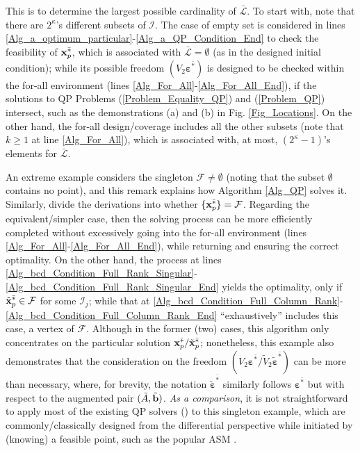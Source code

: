 \documentclass{imaman}
\newcommand{\bfb}{{\bf b}}
\newcommand{\bfx}{{\bf x}}
\newcommand{\bfvarepsilon}{{\boldsymbol \varepsilon}}
\newcommand{\calF}{{\mathcal F}}
\newcommand{\calI}{{\mathcal I}}
\newcommand{\calL}{{\mathcal L}}
\numberwithin{equation}{section}
\begin{document}
\begin{remark}
This is to determine the largest possible cardinality of $\bar\calL$. To start with, note that there are $2^\kappa$'s different subsets of $\calI$. The case of empty set is considered in lines \ref{Alg_a_optimum_particular}-\ref{Alg_a_QP_Condition_End} to check the feasibility of $\bfx_p^{\bar *}$, which is associated with $\bar\calL=\emptyset$ (as in the designed initial condition); while its possible freedom $(V_2\bfvarepsilon^{\bar *})$ is designed to be checked within the for-all environment (lines \ref{Alg_For_All}-\ref{Alg_For_All_End}), if the solutions to QP Problems (\ref{Problem_Equality_QP}) and (\ref{Problem_QP}) intersect, such as the demonstrations (a) and (b) in Fig. \ref{Fig_Locations}. On the other hand, the for-all design/coverage includes all the other subsets (note that $k\ge 1$ at line \ref{Alg_For_All}), which is associated with, at most, $(2^\kappa-1)$'s elements for $\bar\calL$.
\label{Rem_Candidates_Cardinality}
\end{remark}

\begin{remark}
An extreme example considers the singleton $\calF\ne\emptyset$ (noting that the subset $\emptyset$ contains no point), and this remark explains how Algorithm \ref{Alg_QP} solves it. Similarly, divide the derivations into whether $\{\bfx_p^{\bar *}\}=\calF$. Regarding the equivalent/simpler case, then the solving process can be more efficiently completed without excessively going into the for-all environment (lines \ref{Alg_For_All}-\ref{Alg_For_All_End}), while returning and ensuring the correct optimality. On the other hand, the process at lines \ref{Alg_bcd_Condition_Full_Rank_Singular}-\ref{Alg_bcd_Condition_Full_Rank_Singular_End} yields the optimality, only if $\tilde\bfx_p^{\bar *}\in\calF$ for some $\calI_j$; while that at \ref{Alg_bcd_Condition_Full_Column_Rank}-\ref{Alg_bcd_Condition_Full_Column_Rank_End} ``exhaustively'' includes this case, a vertex of $\calF$. Although in the former (two) cases, this algorithm only concentrates on the particular solution $\bfx_p^{\bar *}/\tilde\bfx_p^{\bar *}$; nonetheless, this example also demonstrates that the consideration on the freedom $(V_2\bfvarepsilon^{\bar *}/\tilde V_2\tilde\bfvarepsilon^{\bar *})$ can be more than necessary, where, for brevity, the notation $\tilde\bfvarepsilon^{\bar *}$ similarly follows $\bfvarepsilon^{\bar *}$ but with respect to the augmented pair $(\tilde A,\tilde\bfb)$. \textit{As a comparison}, it is not straightforward to apply most of the existing QP solvers (\citep{BoVa:04,NoWr:06}) to this singleton example, which are commonly/classically designed from the differential perspective while initiated by (knowing) a feasible point, such as the popular ASM \citep{Lu(Ye):03(16)}.
\label{Rem_QP_Singleton_F}
\end{remark}
\end{document}
